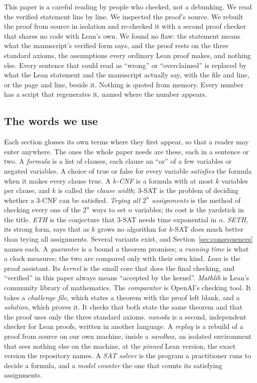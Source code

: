 This paper is a careful reading by people who checked, not a debunking.
We read the verified statement line by line. We inspected the proof's
source. We rebuilt the proof from source in isolation and re-checked it
with a second proof checker that shares no code with Lean's own. We
found no flaw: the statement means what the manuscript's verified form
says, and the proof rests on the three standard axioms, the assumptions
every ordinary Lean proof makes, and nothing else. Every sentence that
could read as ``wrong'' or ``overclaimed'' is replaced by what the Lean
statement and the manuscript actually say, with the file and line, or
the page and line, beside it. Nothing is quoted from memory. Every
number has a script that regenerates it, named where the number
appears.

\subsection{The words we use}
\label{sec:intro-words}

Each section glosses its own terms where they first appear, so that a
reader may enter anywhere. The ones the whole paper needs are these,
each in a sentence or two.
A \emph{formula} is a list of clauses, each clause an ``or'' of a few
variables or negated variables. A choice of true or false for every
variable \emph{satisfies} the formula when it makes every clause true.
A \emph{$k$-CNF} is a formula with at most $k$ variables per clause,
and $k$ is called the \emph{clause width}; 3-SAT is the problem of
deciding whether a 3-CNF can be satisfied.
\emph{Trying all $2^n$ assignments} is the method of checking every one
of the $2^n$ ways to set $n$ variables; its cost is the yardstick in the
title.
\emph{ETH} is the conjecture that 3-SAT needs time exponential in $n$.
\emph{SETH}, its strong form, says that as $k$ grows no algorithm for
$k$-SAT does much better than trying all assignments. Several variants
exist, and Section~\ref{sec:consequences} names each.
A \emph{guarantee} is a bound a theorem promises; a \emph{running time}
is what a clock measures; the two are compared only with their own
kind.
\emph{Lean} is the proof assistant. Its \emph{kernel} is the small core
that does the final checking, and ``verified'' in this paper always
means ``accepted by the kernel''. \emph{Mathlib} is Lean's community
library of mathematics.
The \emph{comparator} is OpenAI's checking tool. It takes a
\emph{challenge file}, which states a theorem with the proof left
blank, and a \emph{solution}, which proves it. It checks that both
state the same theorem and that the proof uses only the three standard
axioms.
\emph{nanoda} is a second, independent checker for Lean proofs, written
in another language. A \emph{replay} is a rebuild of a proof from
source on our own machine, inside a \emph{sandbox}, an isolated
environment that sees nothing else on the machine, at the \emph{pinned}
Lean version, the exact version the repository names.
A \emph{SAT solver} is the program a practitioner runs to decide a
formula, and a \emph{model counter} the one that counts its satisfying
assignments.

